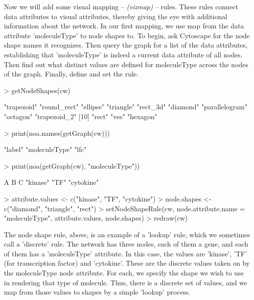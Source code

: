 \documentclass[12pt]{article}
\begin{document}
Now we will add some visual mapping -- \emph {(vizmap)} -- rules.  These rules connect data attributes to visual attributes, thereby giving the eye with additional information about the network.  In our first mapping, we use map from the data attribute 'moleculeType' to node shapes to.  To begin, ask Cytoscape for the node shape names it recognizes.  Then query the graph for a list of the data attributes, establishing that 'moleculeType' is indeed a current data attribute of all nodes.  Then find out what distinct values are defined for moleculeType across the nodes of the graph.  Finally, define and set the rule.

\begin{Schunk}
\begin{Sinput}
> getNodeShapes(cw)
\end{Sinput}
\begin{Soutput}
 [1] "trapezoid"     "round_rect"    "ellipse"       "triangle"      "rect_3d"       "diamond"       "parallelogram" "octagon"       "trapezoid_2"  
[10] "rect"          "vee"           "hexagon"      
\end{Soutput}
\begin{Sinput}
> print(noa.names(getGraph(cw)))
\end{Sinput}
\begin{Soutput}
[1] "label"        "moleculeType" "lfc"         
\end{Soutput}
\begin{Sinput}
> print(noa(getGraph(cw), "moleculeType"))
\end{Sinput}
\begin{Soutput}
         A          B          C 
  "kinase"       "TF" "cytokine" 
\end{Soutput}
\begin{Sinput}
> attribute.values <- c("kinase", "TF", "cytokine")
> node.shapes <- c("diamond", "triangle", "rect")
> setNodeShapeRule(cw, node.attribute.name = "moleculeType", attribute.values, node.shapes)
> redraw(cw)
\end{Sinput}
\end{Schunk}

The node shape rule, above, is an example of a 'lookup' rule, which we sometimes call a 'discrete' rule.  The
network has three nodes, each of them a gene, and each of them has a 'moleculeType' attribute.  In this case, the values
are 'kinase', 'TF' (for transcription factor) and 'cytokine'.  These are the discrete values taken on by the
moleculeType node attribute.  For each, we specify the shape we wish to use in rendering that type of molecule.  Thus, there
is a discrete set of values, and we map from those values to shapes by a simple 'lookup' process.
\end{document}
